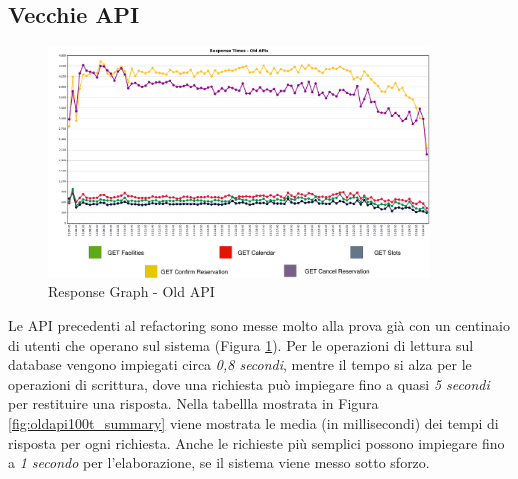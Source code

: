 \subsection{Vecchie API}
\begin{figure}
    \centering
    \includegraphics[width=0.90\textwidth]{images/04_1_old_api_response_graph_legend.pdf}
    \caption{Response Graph - Old API}
    \label{fig:oldapi100t_response}
\end{figure}
Le API precedenti al refactoring sono messe molto alla prova già con un centinaio di utenti che operano sul sistema (Figura \ref{fig:oldapi100t_response}). Per le operazioni di lettura sul database vengono impiegati circa \emph{0,8 secondi}, mentre il tempo si alza per le operazioni di scrittura, dove una richiesta può impiegare fino a quasi \emph{5 secondi} per restituire una risposta.
Nella tabellla mostrata in Figura \ref{fig:oldapi100t_summary} viene mostrata le media (in millisecondi) dei tempi di risposta per ogni richiesta. Anche le richieste più semplici possono impiegare fino a \emph{1 secondo} per l'elaborazione, se il sistema viene messo sotto sforzo.
